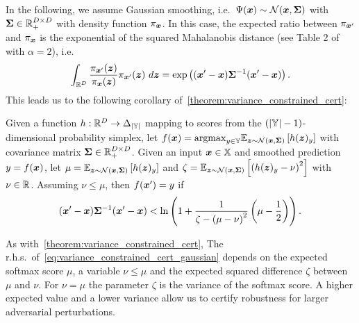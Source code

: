In the following, we assume Gaussian smoothing, i.e.\ $\Psi({\bm{x}}) \sim \mathcal{N}({\bm{x}}, {\bm{\Sigma}})$ with ${\bm{\Sigma}} \in {\mathbb{R}}_+^{D \times D}$ with density function $\pi_{\bm{x}}$. In this case, the expected ratio between $\pi_{{\bm{x}}'}$ and $\pi_{{\bm{x}}}$ is the exponential of the squared Mahalanobis distance (see Table 2 of~\citep{Gil2013} with $\alpha=2$), i.e.
\begin{equation*}
    \int_{{\mathbb{R}}^D} \frac{\pi_{{\bm{x}}'}({\bm{z}})}{\pi_{{\bm{x}}}({\bm{z}})} \pi_{{\bm{x}}'}({\bm{z}}) \ d {\bm{z}} =
    \exp\left(({\bm{x}}' - {\bm{x}}) {\bm{\Sigma}}^{-1} ({\bm{x}}' - {\bm{x}})\right).
\end{equation*}
This leads us to the following corollary of~\cref{theorem:variance_constrained_cert}:
\begin{corollary} \label{prop-appendix-variance-constrained-gaussian}
	Given a function $h : {\mathbb{R}}^{D} \rightarrow \Delta_{|{\mathbb{Y}}|}$ mapping to scores from the $\left(|{\mathbb{Y}}| -1\right)$-dimensional probability simplex, let 
	$f({\bm{x}}) = \mathrm{argmax}_{y \in {\mathbb{Y}}}
	\mathbb{E}_{{\bm{z}} \sim \mathcal{N}({\bm{x}}, {\bm{\Sigma}})}
	\left[h({\bm{z}})_y\right]$ with covariance matrix ${\bm{\Sigma}} \in {\mathbb{R}}_+^{D \times D}$.
	Given an input ${\bm{x}} \in {\mathbb{X}}$ and smoothed prediction ${y} = f({\bm{x}})$, 
	let $\mu = \mathbb{E}_{{\bm{z}} \sim \mathcal{N}({\bm{x}}, {\bm{\Sigma}})}\left[h({\bm{z}})_y\right]$
	and $\zeta = \mathbb{E}_{{\bm{z}} \sim \mathcal{N}({\bm{x}}, {\bm{\Sigma}})}\left[\left(h({\bm{z}})_y - \nu \right)^2\right]$ with $\nu \in {\mathbb{R}}$.
	Assuming $\nu \leq \mu$, then $f({\bm{x}}') = y$ if 
	\begin{equation}\label{eq:variance_constrained_cert_gaussian}
        ({\bm{x}}' - {\bm{x}}) {\bm{\Sigma}}^{-1} ({\bm{x}}' - {\bm{x}})
		< \ln \left(1 + \frac{1}{\zeta - \left(\mu - \nu  \right)^2} \left(\mu - \frac{1}{2}\right)\right).
	\end{equation}
\end{corollary}
As with~\cref{theorem:variance_constrained_cert}, The r.h.s.\ of~\autoref{eq:variance_constrained_cert_gaussian} depends on 
the expected softmax score $\mu$, a variable $\nu \leq \mu$ and the expected squared difference $\zeta$ between $\mu$ and $\nu$.
For $\nu = \mu$ the parameter $\zeta$ is the variance of the softmax score. A higher expected value and a lower variance allow us to certify robustness for larger adversarial perturbations.

